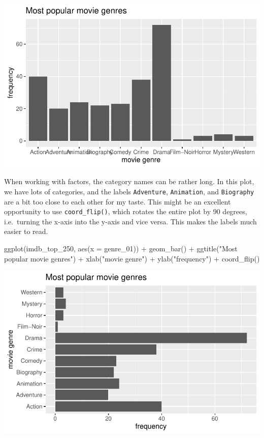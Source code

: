 \documentclass[
  letterpaper,
]{krantz}
\makeatletter
\newenvironment{Shaded}{\begin{snugshade}}{\end{snugshade}}
\newcommand{\AttributeTok}[1]{\textcolor[rgb]{0.40,0.45,0.13}{#1}}
\newcommand{\FunctionTok}[1]{\textcolor[rgb]{0.28,0.35,0.67}{#1}}
\newcommand{\NormalTok}[1]{\textcolor[rgb]{0.00,0.23,0.31}{#1}}
\newcommand{\SpecialCharTok}[1]{\textcolor[rgb]{0.37,0.37,0.37}{#1}}
\newcommand{\StringTok}[1]{\textcolor[rgb]{0.13,0.47,0.30}{#1}}
\newenvironment{kframe}{%
\medskip{}
\setlength{\fboxsep}{.8em}
 \def\at@end@of@kframe{}%
 \ifinner\ifhmode%
  \def\at@end@of@kframe{\end{minipage}}%
  \begin{minipage}{\columnwidth}%
 \fi\fi%
 \def\FrameCommand##1{\hskip\@totalleftmargin \hskip-\fboxsep
 \colorbox{shadecolor}{##1}\hskip-\fboxsep
     \hskip-\linewidth \hskip-\@totalleftmargin \hskip\columnwidth}%
 \MakeFramed {\advance\hsize-\width
   \@totalleftmargin\z@ \linewidth\hsize
   \@setminipage}}%
 {\par\unskip\endMakeFramed%
 \at@end@of@kframe}
\renewenvironment{Shaded}{\begin{kframe}}{\end{kframe}}
\makeatother
\begin{document}
\includegraphics{08_descriptive_statistics_files/figure-pdf/most-popular-genre-with-barplot-extras-1.pdf}

When working with factors, the category names can be rather long. In
this plot, we have lots of categories, and the labels
\texttt{Adventure}, \texttt{Animation}, and \texttt{Biography} are a bit
too close to each other for my taste. This might be an excellent
opportunity to use \texttt{coord\_flip()}, which rotates the entire plot
by 90 degrees, i.e.~turning the x-axis into the y-axis and vice versa.
This makes the labels much easier to read.

\begin{Shaded}
\begin{Highlighting}[]
\FunctionTok{ggplot}\NormalTok{(imdb\_top\_250, }\FunctionTok{aes}\NormalTok{(}\AttributeTok{x =}\NormalTok{ genre\_01)) }\SpecialCharTok{+}
  \FunctionTok{geom\_bar}\NormalTok{() }\SpecialCharTok{+}
  \FunctionTok{ggtitle}\NormalTok{(}\StringTok{"Most popular movie genres"}\NormalTok{) }\SpecialCharTok{+}
  \FunctionTok{xlab}\NormalTok{(}\StringTok{"movie genre"}\NormalTok{) }\SpecialCharTok{+}
  \FunctionTok{ylab}\NormalTok{(}\StringTok{"frequency"}\NormalTok{) }\SpecialCharTok{+}
  \FunctionTok{coord\_flip}\NormalTok{()}
\end{Highlighting}
\end{Shaded}

\includegraphics{08_descriptive_statistics_files/figure-pdf/popular-genre-barplot-extras-formatted-1.pdf}
\end{document}
